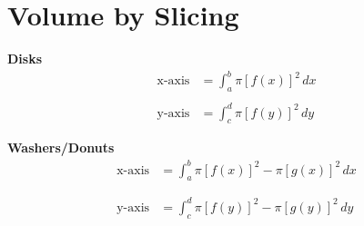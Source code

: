 \section{Volume by Slicing}

\begin{framed}
  \noindent \textbf{Disks}
  \begin{align*}
    \text{x-axis} &= \int_a^b \pi [f(x)]^2 \, dx\\\\
    \text{y-axis} &= \int_c^d \pi [f(y)]^2 \, dy
  \end{align*}
\end{framed}

\begin{framed}
  \noindent \textbf{Washers/Donuts}
  \begin{align*}
    \text{x-axis} &= \int_a^b \pi [f(x)]^2 - \pi [g(x)]^2 \, dx\\\\\\
    \text{y-axis} &= \int_c^d \pi [f(y)]^2 - \pi [g(y)]^2 \, dy
  \end{align*}
\end{framed}